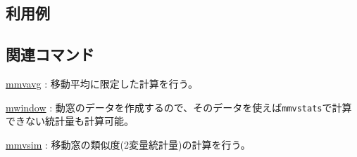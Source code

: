 \subsection*{利用例}

\subsection*{関連コマンド}
\hyperref[sect:mmvavg] {mmvavg} : 移動平均に限定した計算を行う。

\hyperref[sect:mwindow] {mwindow} : 動窓のデータを作成するので、そのデータを使えば\verb|mmvstats|で計算できない統計量も計算可能。

\hyperref[sect:mmvsim] {mmvsim} : 移動窓の類似度(2変量統計量)の計算を行う。

%

